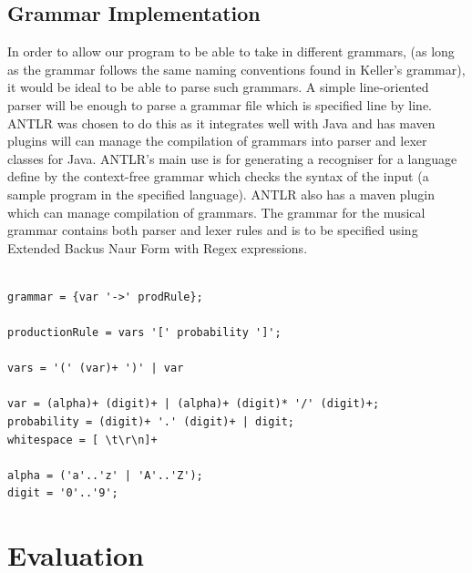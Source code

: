 \documentclass[pdftex,12pt,a4paper]{report}
\begin{document}
\section{Grammar Implementation}
In order to allow our program to be able to take in different grammars, (as long as the grammar follows the same naming conventions found in Keller's grammar), it would be ideal to be able to parse such grammars. A simple line-oriented parser will be enough to parse a grammar file which is specified line by line. ANTLR was chosen to do this as it integrates well with Java and has maven plugins will can manage the compilation of grammars into parser and lexer classes for Java. ANTLR's main use is for generating a recogniser for a language define by the context-free grammar which checks the syntax of the input (a sample program in the specified language). ANTLR also has a maven plugin which can manage compilation of grammars. The grammar for the musical grammar contains both parser and lexer rules and is to be specified using Extended Backus Naur Form with Regex expressions. 

\begin{verbatim}

grammar = {var '->' prodRule};
  
productionRule = vars '[' probability ']';

vars = '(' (var)+ ')' | var

var = (alpha)+ (digit)+ | (alpha)+ (digit)* '/' (digit)+;
probability = (digit)+ '.' (digit)+ | digit;
whitespace = [ \t\r\n]+

alpha = ('a'..'z' | 'A'..'Z');
digit = '0'..'9';

\end{verbatim}




\chapter{Evaluation}
\end{document}
